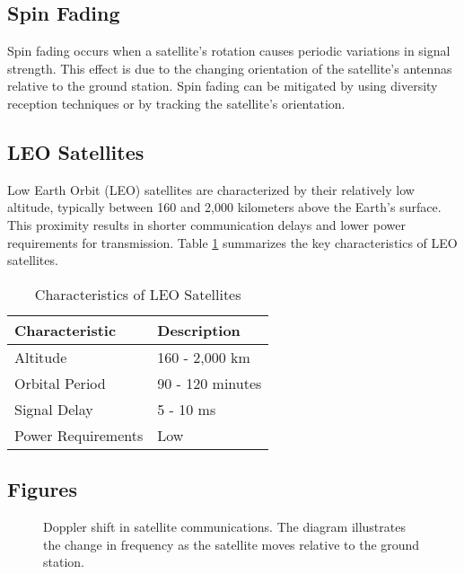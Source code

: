 \subsection*{Spin Fading}
Spin fading occurs when a satellite's rotation causes periodic variations in signal strength. This effect is due to the changing orientation of the satellite's antennas relative to the ground station. Spin fading can be mitigated by using diversity reception techniques or by tracking the satellite's orientation.

\subsection*{LEO Satellites}
Low Earth Orbit (LEO) satellites are characterized by their relatively low altitude, typically between 160 and 2,000 kilometers above the Earth's surface. This proximity results in shorter communication delays and lower power requirements for transmission. Table \ref{tab:leo_satellites} summarizes the key characteristics of LEO satellites.

\begin{table}[h!]
    \centering
    \caption{Characteristics of LEO Satellites}
    \label{tab:leo_satellites}
    \begin{tabular}{|l|l|}
        \hline
        \textbf{Characteristic} & \textbf{Description} \\
        \hline
        Altitude & 160 - 2,000 km \\
        Orbital Period & 90 - 120 minutes \\
        Signal Delay & 5 - 10 ms \\
        Power Requirements & Low \\
        \hline
    \end{tabular}
\end{table}

\subsection*{Figures}
\begin{figure}[h!]
    \centering
    \caption{Doppler shift in satellite communications. The diagram illustrates the change in frequency as the satellite moves relative to the ground station.}
    \label{fig:doppler_shift}
\end{figure}

